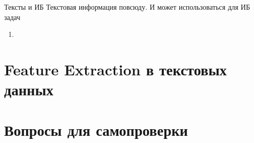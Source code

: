 \begin{frame}{Тексты и ИБ}
	Текстовая информация повсюду. 
	И может использоваться для ИБ задач
	\begin{enumerate}
		\item 
	\end{enumerate}
\end{frame}

\section{Feature Extraction в текстовых данных}\label{section:texts_fe}


\section{Вопросы для самопроверки}

